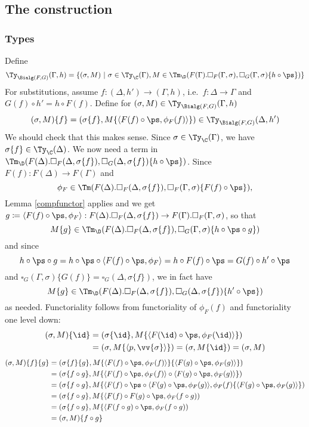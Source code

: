 \documentclass{article}
\newcommand{\isoFL}{\ensuremath{\phi_{F}}} %
\begin{document}
\subsection{The construction}

\subsubsection{Types}

Define
\[
\Ty_{\Bialg(F, G)}(\Gamma, h) = \{ (\sigma, M)\ |\ \sigma \in \Ty_{\C}(\Gamma),
 M \in \Tm_\D(F(\Gamma).\square_F(\Gamma, \sigma),\square_G(\Gamma, \sigma)\{h \circ \ps\})\}
\]
For substitutions, assume $f : (\Delta, h') \to (\Gamma, h)$, i.e.\ $f
: \Delta \to \Gamma$ and $G(f) \circ h' = h \circ F(f)$. Define for $(\sigma, M) \in \Ty_{\Bialg(F, G)}(\Gamma, h)$
\[
(\sigma, M)\{f\} = (\sigma\{f\}, M\{\langle F(f) \circ \ps, \isoFL(f)\rangle\}) \in \Ty_{\Bialg(F, G)}(\Delta, h')
\]
%
We should check that this makes sense. Since $\sigma \in
\Ty_{\C}(\Gamma)$, we have $\sigma\{f\} \in \Ty_{\C}(\Delta)$. We now
need a term in $\Tm_\D(F(\Delta).\square_F(\Delta,
\sigma\{f\}),\square_G(\Delta, \sigma\{f\})\{h \circ \ps\})$.  Since
$F(f) : F(\Delta) \to F(\Gamma)$ and
\[
\isoFL \in \Tm(F(\Delta).\square_F(\Delta, \sigma\{f\}),
\square_F(\Gamma, \sigma)\{F(f) \circ \ps\}),
\]
Lemma \ref{compfunctor} applies and we get $g \coloneqq \langle F(f) \circ \ps,
\isoFL\rangle : F(\Delta).\square_F(\Delta, \sigma\{f\}) \to
F(\Gamma).\square_F(\Gamma, \sigma)$, so that
\[
M\{g\} \in
\Tm_\D(F(\Delta).\square_F(\Delta, \sigma\{f\}),\square_G(\Gamma,
\sigma)\{h \circ \ps \circ g\})
\]
and since
\[
h \circ \ps \circ g = h \circ \ps \circ \langle F(f) \circ \ps,
\isoFL\rangle = h \circ F(f) \circ \ps = G(f) \circ h' \circ \ps
\]
and $\square_G(\Gamma, \sigma)\{G(f)\} = \square_G(\Delta,
\sigma\{f\})$, we in fact have
\[
M\{g\} \in \Tm_\D(F(\Delta).\square_F(\Delta,
\sigma\{f\}),\square_G(\Delta, \sigma\{f\})\{h' \circ \ps\})
\]
as needed.
Functoriality follows from functoriality of $\isoFL(f)$ and functoriality one level down:
\begin{align*}
(\sigma, M)\{\id\} &= (\sigma\{\id\}, M\{\langle F(\id) \circ \ps, \isoFL(\id)\rangle\}) \\ &=
  (\sigma, M\{\langle p, \vv{\sigma}\rangle\}) = (\sigma, M\{\id\}) = (\sigma, M)
\end{align*}
\begin{align*}
  (\sigma, M)\{f\}\{g\} 
  &= (\sigma\{f\}\{g\}, M\{\langle F(f) \circ \ps, \isoFL(f)\rangle\}\{\langle F(g) \circ \ps, \isoFL(g)\rangle\}) \\
  &= (\sigma\{f \circ g\}, M\{\langle F(f) \circ \ps, \isoFL(f)\rangle \circ \langle F(g) \circ \ps, \isoFL(g)\rangle\}) \\
  &= (\sigma\{f \circ g\}, M\{\langle F(f) \circ \ps \circ \langle F(g) \circ \ps, \isoFL(g)\rangle, \isoFL(f)\{\langle F(g) \circ \ps, \isoFL(g)\rangle\}) \\
  &= (\sigma\{f \circ g\}, M\{\langle F(f) \circ F(g) \circ \ps, \isoFL(f \circ g)) \\
  &= (\sigma\{f \circ g\}, M\{\langle F(f \circ g) \circ \ps, \isoFL(f \circ g)) \\
  &= (\sigma, M)\{f \circ g\}
\end{align*}
\end{document}
